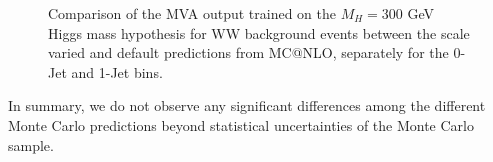 \begin{figure}[!htbp]
\begin{center}
\caption{Comparison of the MVA output trained on the $M_{H}=300$ GeV Higgs mass hypothesis
for WW background events between the scale varied and default predictions from MC@NLO,
separately for the 0-Jet and 1-Jet bins.
}
\label{fig:wwshape_scalevariation_MVA300_MadgrahVsMCAtNLO}
\end{center}
\end{figure}

In summary, we do not observe any significant differences among the different 
Monte Carlo predictions beyond statistical uncertainties of the Monte Carlo
sample.
